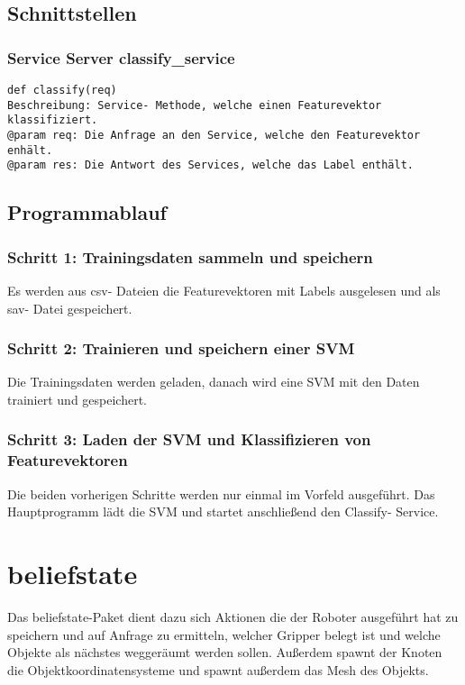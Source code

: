 \documentclass{suturo}
\begin{document}
\subsection{Schnittstellen}

\subsubsection{Service Server classify\_service}
\begin{verbatim}
def classify(req)
Beschreibung: Service- Methode, welche einen Featurevektor klassifiziert.
@param req: Die Anfrage an den Service, welche den Featurevektor enhält.  
@param res: Die Antwort des Services, welche das Label enthält.
\end{verbatim}

\subsection{Programmablauf}
\subsubsection{Schritt 1: Trainingsdaten sammeln und speichern}
Es werden aus csv- Dateien die Featurevektoren mit Labels ausgelesen und als sav- Datei gespeichert.

\subsubsection{Schritt 2: Trainieren und speichern einer SVM} 
Die Trainingsdaten werden geladen, danach wird eine SVM mit den Daten trainiert und gespeichert.

\subsubsection{Schritt 3: Laden der SVM und Klassifizieren von Featurevektoren}
Die beiden vorherigen Schritte werden nur einmal im Vorfeld ausgeführt. Das Hauptprogramm lädt die SVM und startet anschließend den Classify- Service.

\section{beliefstate}
Das beliefstate-Paket dient dazu sich Aktionen die der Roboter ausgeführt hat zu speichern und auf Anfrage zu ermitteln, welcher Gripper belegt ist und welche Objekte als nächstes weggeräumt werden sollen. Außerdem spawnt der Knoten die Objektkoordinatensysteme und spawnt außerdem das Mesh des Objekts.
\end{document}
